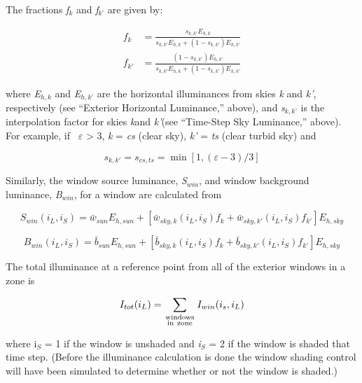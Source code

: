 The fractions \emph{f\(_{k}\)} and \emph{f\(_{k’}\)} are given by:

\begin{equation}
  \begin{array}{rl}
    f_k    & = \frac{ s_{k,k'} E_{h,k} } { s_{k,k'} E_{h,k} + (1 - s_{k,k'})E_{h,k'}} \\
    f_{k'} & = \frac{ (1 - s_{k,k'} ) E_{h,k'} } { s_{k,k'} E_{h,k} + (1 - s_{k,k'} ) E_{h,k'}}
  \end{array}
\end{equation}

where \emph{E\(_{h,k}\)} and \emph{E\(_{h,k’}\)} are the horizontal illuminances from skies \emph{k} and \emph{k'}, respectively (see ``Exterior Horizontal Luminance,'' above), and \emph{s\(_{k,k’}\)} is the interpolation factor for skies \emph{k}and \emph{k'}(see ``Time-Step Sky Luminance,'' above).~ For example, if~ \emph{$\varepsilon$} \textgreater{} 3, \emph{k} = \emph{cs} (clear sky), \emph{k'} = \emph{ts} (clear turbid sky) and

\begin{equation}
s_{k,k'} = s_{cs,ts} = \min [1,(\varepsilon - 3)/3]
\end{equation}

Similarly, the window source luminance, \emph{S\(_{win}\)}, and window background luminance, \emph{B\(_{win}\)}, for a window are calculated from

\begin{equation}
{S_{win}}({i_L},{i_S}) = {\bar w_{sun}}{E_{h,sun}} + [{\bar w_{sky,k}}({i_L},{i_S}){f_k} + {\bar w_{sky,k'}}({i_L},{i_S}){f_{k'}}]{E_{h,sky}}
\end{equation}

\begin{equation}
{B_{win}}({i_L},{i_S}) = {\bar b_{sun}}{E_{h,sun}} + [{\bar b_{sky,k}}({i_L},{i_S}){f_k} + {\bar b_{sky,k'}}({i_L},{i_S}){f_{k'}}]{E_{h,sky}}
\end{equation}

The total illuminance at a reference point from all of the exterior windows in a zone is

\begin{equation}
  {I_{tot}}({i_L}) = \sum\limits_{\scriptstyle{\rm{windows}}\atop\scriptstyle{\rm{in~zone}}} {{I_{win}}({i_s},{i_L})}
\end{equation}

where i\(_{S}\) = 1 if the window is unshaded and \emph{i\(_{S}\)} = 2 if the window is shaded that time step. (Before the illuminance calculation is done the window shading control will have been simulated to determine whether or not the window is shaded.)

